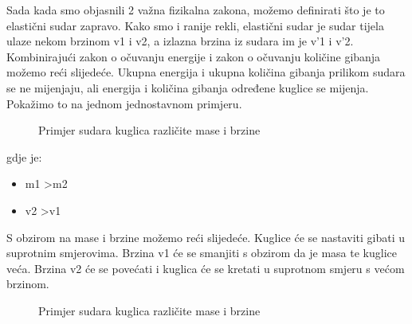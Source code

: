 Sada kada smo objasnili 2 važna fizikalna zakona, možemo definirati što je to elastični sudar zapravo. Kako smo i ranije rekli, elastični sudar je sudar tijela ulaze nekom brzinom v1 i v2, a izlazna brzina iz sudara im je v'1 i v'2. Kombinirajući zakon o očuvanju energije i zakon o očuvanju količine gibanja možemo reći slijedeće. Ukupna energija i ukupna količina gibanja prilikom sudara se ne mijenjaju, ali energija i količina gibanja određene kuglice se mijenja\cite{13}. Pokažimo to na jednom jednostavnom primjeru.
\begin{figure}[!http]
	\begin{center}
	\end{center}
	\caption {Primjer sudara kuglica različite mase i brzine}
	\label{fig:23}
\end{figure}
\newline
gdje je:
\begin{itemize}
	\item m1 \textgreater m2
	\item v2 \textgreater v1
\end{itemize}
S obzirom na mase i brzine možemo reći slijedeće. Kuglice će se nastaviti gibati u suprotnim smjerovima. Brzina v1 će se smanjiti s obzirom da je masa te kuglice veća. Brzina v2 će se povećati i kuglica će se kretati u suprotnom smjeru s većom brzinom.\newpage
\begin{figure}[!http]
	\begin{center}
	\end{center}
	\caption {Primjer sudara kuglica različite mase i brzine}
	\label{fig:24}
\end{figure} 
